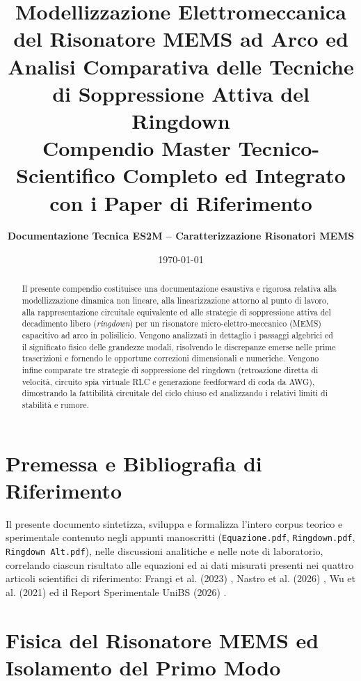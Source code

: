 \documentclass[11pt,a4paper]{article}
\title{\textbf{\Large Modellizzazione Elettromeccanica del Risonatore MEMS ad Arco ed Analisi Comparativa delle Tecniche di Soppressione Attiva del Ringdown}\\
\large Compendio Master Tecnico-Scientifico Completo ed Integrato con i Paper di Riferimento}
\author{\textbf{Documentazione Tecnica ES2M -- Caratterizzazione Risonatori MEMS}}
\date{\today}
\begin{document}
\maketitle

\begin{abstract}
Il presente compendio costituisce una documentazione esaustiva e rigorosa relativa alla modellizzazione dinamica non lineare, alla linearizzazione attorno al punto di lavoro, alla rappresentazione circuitale equivalente ed alle strategie di soppressione attiva del decadimento libero (\emph{ringdown}) per un risonatore micro-elettro-meccanico (MEMS) capacitivo ad arco in polisilicio. Vengono analizzati in dettaglio i passaggi algebrici ed il significato fisico delle grandezze modali, risolvendo le discrepanze emerse nelle prime trascrizioni e fornendo le opportune correzioni dimensionali e numeriche. Vengono infine comparate tre strategie di soppressione del ringdown (retroazione diretta di velocità, circuito spia virtuale RLC e generazione feedforward di coda da AWG), dimostrando la fattibilità circuitale del ciclo chiuso ed analizzando i relativi limiti di stabilità e rumore.
\end{abstract}

\tableofcontents
\newpage

\section*{Premessa e Bibliografia di Riferimento}

Il presente documento sintetizza, sviluppa e formalizza l'intero corpus teorico e sperimentale contenuto negli appunti manoscritti (\texttt{Equazione.pdf}, \texttt{Ringdown.pdf}, \texttt{Ringdown Alt.pdf}), nelle discussioni analitiche e nelle note di laboratorio, correlando ciascun risultato alle equazioni ed ai dati misurati presenti nei quattro articoli scientifici di riferimento: Frangi et al. (2023) \cite{Frangi2023}, Nastro et al. (2026) \cite{Nastro2026}, Wu et al. (2021) \cite{Wu2021} ed il Report Sperimentale UniBS (2026) \cite{UniBS2026}.

\newpage

\section{Fisica del Risonatore MEMS ed Isolamento del Primo Modo}
\end{document}
